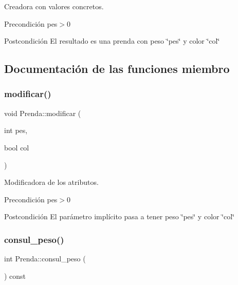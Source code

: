 Creadora con valores concretos. 

\begin{DoxyPrecond}{Precondición}
pes$>$0 
\end{DoxyPrecond}
\begin{DoxyPostcond}{Postcondición}
El resultado es una prenda con peso \char`\"{}pes\char`\"{} y color \char`\"{}col\char`\"{} 
\end{DoxyPostcond}


\subsection{Documentación de las funciones miembro}
\mbox{\label{class_prenda_ab25b2a66034eb2c0fccfb1f3cedbb5a7}} 
\subsubsection{\texorpdfstring{modificar()}{modificar()}}
{\footnotesize\ttfamily void Prenda\+::modificar (\begin{DoxyParamCaption}\item[{int}]{pes,  }\item[{bool}]{col }\end{DoxyParamCaption})}



Modificadora de los atributos. 

\begin{DoxyPrecond}{Precondición}
pes$>$0 
\end{DoxyPrecond}
\begin{DoxyPostcond}{Postcondición}
El parámetro implícito pasa a tener peso \char`\"{}pes\char`\"{} y color \char`\"{}col\char`\"{} 
\end{DoxyPostcond}
\mbox{\label{class_prenda_aef786876c5b4bb4f8f7fdd980f332b14}} 
\subsubsection{\texorpdfstring{consul\+\_\+peso()}{consul\_peso()}}
{\footnotesize\ttfamily int Prenda\+::consul\+\_\+peso (\begin{DoxyParamCaption}{ }\end{DoxyParamCaption}) const}




